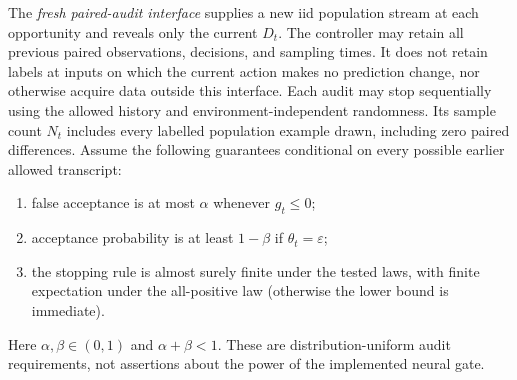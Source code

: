 The \emph{fresh paired-audit interface} supplies a new iid population stream
at each opportunity and reveals only the current $D_t$.
The controller may retain all previous paired observations, decisions,
and sampling times. It does not retain labels at inputs on which the
current action makes no prediction change, nor otherwise acquire data
outside this interface. Each audit may stop sequentially using the allowed
history and environment-independent randomness. Its sample count $N_t$
includes every labelled population example drawn, including zero paired
differences. Assume the following guarantees conditional on every possible
earlier allowed transcript:
\begin{enumerate}
 \item false acceptance is at most $\alpha$ whenever $g_t\le0$;
 \item acceptance probability is at least $1-\beta$ if
 $\theta_t=\varepsilon$;
 \item the stopping rule is almost surely finite under the tested laws,
 with finite expectation under the all-positive law (otherwise the
 lower bound is immediate).
\end{enumerate}
Here $\alpha,\beta\in(0,1)$ and $\alpha+\beta<1$.
These are distribution-uniform audit requirements, not assertions about
the power of the implemented neural gate.

